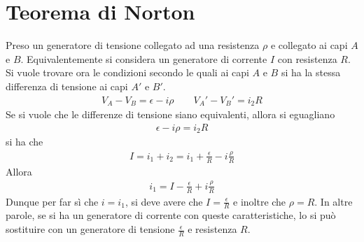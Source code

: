 \documentclass[a4paper, oneside]{article}
\begin{document}
\section{Teorema di Norton}
Preso un generatore di tensione collegato ad una resistenza $\rho$ 
e collegato ai capi $A$ e $B$. Equivalentemente si considera un generatore 
di corrente $I$ con resistenza $R$. Si vuole trovare ora le condizioni secondo le 
quali ai capi $A$ e $B$ si ha la stessa differenza di tensione ai capi $A'$ e $B'$. 
\begin{gather*}
    V_A - V_B = \epsilon - i\rho \qquad V_A' - V_B' = i_2R
\end{gather*}
Se si vuole che le differenze di tensione siano equivalenti, allora si eguagliano
\begin{gather*}
    \epsilon - i\rho = i_2R 
\end{gather*}
si ha che 
\begin{gather*}
    I = i_1 + i_2 = i_1 + \frac{\epsilon}{R} - i\frac{\rho}{R}
\end{gather*}
Allora 
\begin{gather*}
    i_1 = I - \frac{\epsilon}{R} + i\frac{\rho}{R}
\end{gather*}
Dunque per far sì che $i = i_1$, si deve avere che $I = \frac{\epsilon}{R}$ e 
inoltre che $\rho = R$. In altre parole, se si ha un generatore di corrente con queste caratteristiche, 
lo si può sostituire con un generatore di tensione $\frac{\epsilon}{R}$ e resistenza $R$. 
\end{document}
